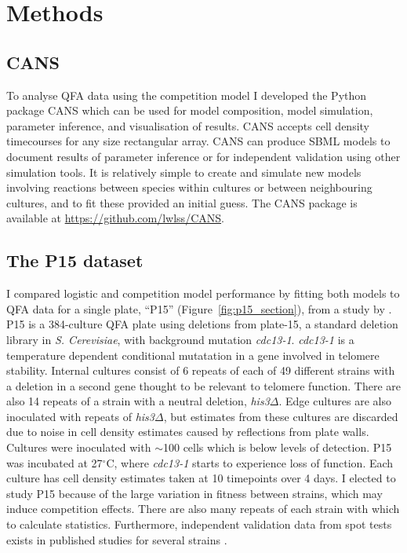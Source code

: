 \graphicspath{{images/}}

\section{Methods}
\label{sec:methods}

\subsection{CANS}

To analyse QFA data using the competition model I developed the Python
package CANS which can be used for model composition, model
simulation, parameter inference, and visualisation of results. CANS
accepts cell density timecourses for any size rectangular array. CANS
can produce SBML models to document results of parameter inference or
for independent validation using other simulation tools. It is
relatively simple to create and simulate new models involving
reactions between species within cultures or between neighbouring
cultures, and to fit these provided an initial guess. The CANS package
is available at
\href{https://github.com/lwlss/CANS}{https://github.com/lwlss/CANS}.



\subsection{The P15 dataset}
\label{sec:P15_description}

I compared logistic and competition model performance by fitting both
models to QFA data for a single plate, ``P15''
(Figure~\ref{fig:p15_section}), from a study by
\citet{Addinall2011}. P15 is a 384-culture QFA plate using deletions
from plate-15, a standard deletion library in \textit{S. Cerevisiae},
with background mutation \textit{cdc13-1}. \textit{cdc13-1} is a
temperature dependent conditional mutatation in a gene involved in
telomere stability. Internal cultures consist of 6 repeats of each of
49 different strains with a deletion in a second gene thought to be
relevant to telomere function. There are also 14 repeats of a strain
with a neutral deletion, \textit{his3}\(\Delta\). Edge cultures are
also inoculated with repeats of \textit{his3}\(\Delta\), but estimates
from these cultures are discarded due to noise in cell density
estimates caused by reflections from plate walls. Cultures were
inoculated with \(\sim\)100 cells which is below levels of
detection. P15 was incubated at 27\(^{\circ}\)C, where
\textit{cdc13-1} starts to experience loss of function. Each culture
has cell density estimates taken at 10 timepoints over 4 days. I
elected to study P15 because of the large variation in fitness between
strains, which may induce competition effects. There are also many
repeats of each strain with which to calculate
statistics. Furthermore, independent validation data from spot tests
exists in published studies for several strains
\citep{maringele2002exo1,zubko2004exo1,Holstein20141259,foster2006mrx}.

